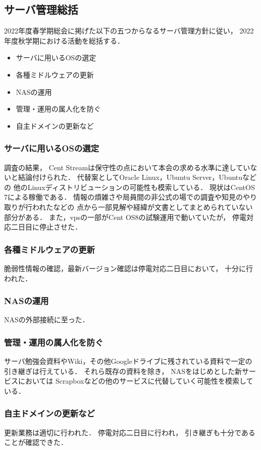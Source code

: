\subsection*{サーバ管理総括}


2022年度春学期総会に掲げた以下の五つからなるサーバ管理方針に従い，
2022年度秋学期における活動を総括する．
\begin{itemize}
    \item サーバに用いるOSの選定
    \item 各種ミドルウェアの更新
    \item NASの運用
    \item 管理・運用の属人化を防ぐ
    \item 自主ドメインの更新など
\end{itemize}

\subsubsection*{サーバに用いるOSの選定}
調査の結果，
Cent Streamは保守性の点において本会の求める水準に達していないと結論付けられた．
代替案としてOracle Linux，Ubuntu Server，Ubuntuなどの
他のLinuxディストリビューションの可能性も模索している．
現状はCentOS 7による稼働である．
情報の煩雑さや局員間の非公式の場での調査や知見のやり取りが行われたなどの
点から一部見解や経緯が文書としてまとめられていない部分がある．
また，vpsの一部がCent OS8の試験運用で動いていたが，
停電対応二日目に停止させた．

\subsubsection*{各種ミドルウェアの更新}
脆弱性情報の確認，最新バージョン確認は停電対応二日目において，
十分に行われた．

\subsubsection*{NASの運用}
NASの外部接続に至った．

\subsubsection*{管理・運用の属人化を防ぐ}
サーバ勉強会資料やWiki，その他Googleドライブに残されている資料で一定の引き継ぎは行えている．
それら既存の資料を除き，
NASをはじめとした新サービスにおいては
Scrapboxなどの他のサービスに代替していく可能性を模索している．

\subsubsection*{自主ドメインの更新など}
更新業務は適切に行われた．
停電対応二日目に行われ，
引き継ぎも十分であることが確認できた．
